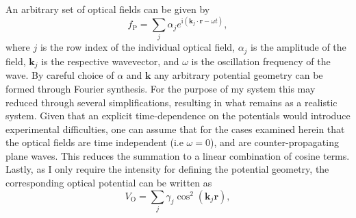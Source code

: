 {
\iffalse
An arbitrary set of optical fields can be given by
\begin{equation}\label{eqn:optfield}
    f_{\textrm{P}} = \displaystyle\sum\limits_{j} \alpha_j e^{\textrm{i}\left(\mathbf{k}_j\cdot\mathbf{r} - \omega t\right)},
\end{equation}
where $j$ is the row index of the individual optical field, $\alpha_j$ is the amplitude of the field, $\mathbf{k}_j$ is the respective wavevector, and $\omega$ is the oscillation frequency of the wave. By careful choice of $\alpha$ and $\mathbf{k}$ any arbitrary potential geometry can be formed through Fourier synthesis. For the purpose of my system this may reduced through several simplifications, resulting in what remains as a realistic system. Given that an explicit time-dependence on the potentials would introduce experimental difficulties, one can assume that for the cases examined herein that the optical fields are time independent (i.e $\omega=0$), and are counter-propagating plane waves. This reduces the summation to a linear combination of cosine terms. Lastly, as I only require the intensity for defining the potential geometry, the corresponding optical potential can be written as
\begin{equation}\label{eqn:vopt}
    V_{\textrm{O}} = \displaystyle\sum\limits_{j} \gamma_j \cos^2 \left(\mathbf{k}_j \mathbf{r}\right),

\end{equation}}
